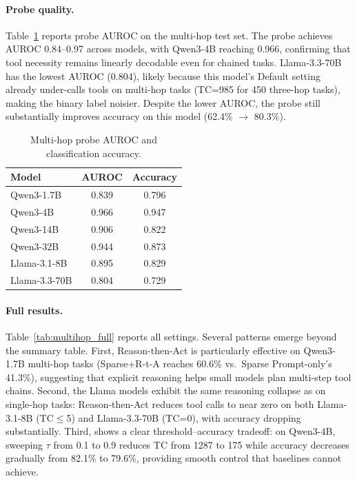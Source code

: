 \paragraph{Probe quality.}
Table~\ref{tab:multihop_auroc} reports probe AUROC on the multi-hop test set. The probe achieves AUROC 0.84--0.97 across models, with Qwen3-4B reaching 0.966, confirming that tool necessity remains linearly decodable even for chained tasks. Llama-3.3-70B has the lowest AUROC (0.804), likely because this model's Default setting already under-calls tools on multi-hop tasks (TC=985 for 450 three-hop tasks), making the binary label noisier. Despite the lower AUROC, the probe still substantially improves accuracy on this model (62.4\% $\to$ 80.3\%).

\begin{table}[H]
\caption{Multi-hop probe AUROC and classification accuracy.}
\label{tab:multihop_auroc}
\centering
\small
\begin{tabular}{lcc}
\toprule
Model & AUROC & Accuracy \\
\midrule
Qwen3-1.7B   & 0.839 & 0.796 \\
Qwen3-4B     & 0.966 & 0.947 \\
Qwen3-14B    & 0.906 & 0.822 \\
Qwen3-32B    & 0.944 & 0.873 \\
Llama-3.1-8B & 0.895 & 0.829 \\
Llama-3.3-70B& 0.804 & 0.729 \\
\bottomrule
\end{tabular}
\end{table}

\paragraph{Full results.}
Table~\ref{tab:multihop_full} reports all settings. Several patterns emerge beyond the summary table. First, Reason-then-Act is particularly effective on Qwen3-1.7B multi-hop tasks (Sparse+R-t-A reaches 60.6\% vs.\ Sparse Prompt-only's 41.3\%), suggesting that explicit reasoning helps small models plan multi-step tool chains. Second, the Llama models exhibit the same reasoning collapse as on single-hop tasks: Reason-then-Act reduces tool calls to near zero on both Llama-3.1-8B (TC$\leq$5) and Llama-3.3-70B (TC=0), with accuracy dropping substantially. Third, \method{} shows a clear threshold--accuracy tradeoff: on Qwen3-4B, sweeping $\tau$ from 0.1 to 0.9 reduces TC from 1287 to 175 while accuracy decreases gradually from 82.1\% to 79.6\%, providing smooth control that baselines cannot achieve.

